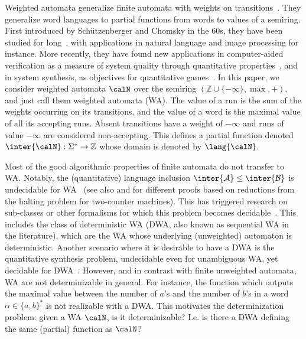 \documentclass[a4paper]{article}
\begin{document}
 Weighted automata generalize finite
automata with weights on transitions~\cite{Droste:2009:HWA:1667106}. 
They generalize word languages to partial functions from words to
values of a semiring. First introduced by Sch\"utzenberger and Chomsky in the 60s,
they have been studied for long~\cite{Droste:2009:HWA:1667106}, with
applications in natural language and image processing for
instance. More recently, they have found new applications in
computer-aided verification as a measure of system
quality through quantitative properties~\cite{cdh10}, and in
system synthesis, as objectives for quantitative games~\cite{conf/concur/FiliotGR12}. 
In this paper, we consider weighted automata $\calN$ over the semiring
$(\mathbb{Z}\cup  \{ -\infty \}, \max,+)$, and just
call them weighted automata (WA). The value of a run is the sum of the weights
occurring on its transitions, and the value of a word is the maximal value of all
its accepting runs.  Absent transitions have a weight of $-\infty$ and runs of
value $-\infty$ are considered non-accepting. This defines a partial function
denoted $\inter{\calN} : \Sigma^*\rightarrow \mathbb{Z}$ whose domain is denoted
by $\lang{\calN}$. 

 Most of the good algorithmic properties of
finite automata do not transfer to WA. Notably, the
(quantitative) language inclusion $\inter{\mathcal{A}} \leq \inter{\mathcal{B}}$ is undecidable for
WA~\cite{Krob:1992:EPR} (see also \cite{dav16} and
\cite{conf/atva/AlmagorBK11} for different proofs based on reductions
from the halting problem for two-counter machines). This has triggered 
research on sub-classes or other formalisms for which this problem becomes
decidable~\cite{DBLP:conf/fsttcs/FiliotGR14,conf/concur/ChatterjeeDEHR10}.
This includes the class of deterministic WA (DWA, also known as sequential
WA in the literature), which are the WA whose underlying (unweighted)
automaton is deterministic. Another scenario where it is desirable to
have a DWA is the quantitative synthesis problem,  
undecidable even for unambiguous WA, yet decidable for
DWA~\cite{conf/concur/FiliotGR12}. However, and in contrast with finite unweighted
automata, WA are not determinizable in general. For instance, the function
which outputs the maximal value between the number of $a$'s and the
number of $b$'s in a word $\alpha \in\{a,b\}^*$ is not realizable with a DWA. 
This motivates the determinization problem: given a WA $\calN$, is it
determinizable? I.e. is there a DWA defining the same
(partial) function as $\calN$? 
\end{document}
